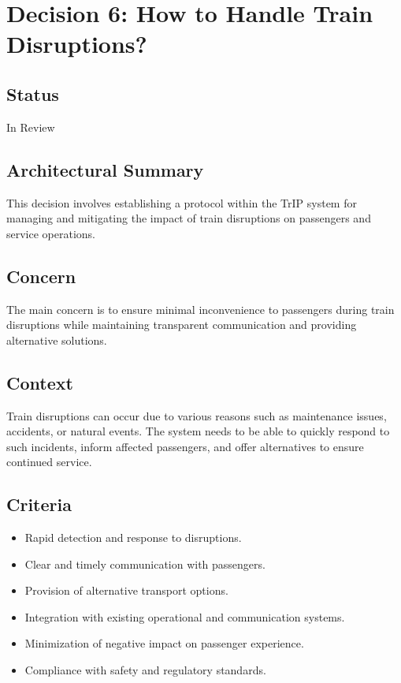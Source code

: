 \section*{Decision 6: How to Handle Train Disruptions?}

\subsection*{Status}
In Review

\subsection*{Architectural Summary}
This decision involves establishing a protocol within the TrIP system for managing and mitigating the impact of train disruptions on passengers and service operations.

\subsection*{Concern}
The main concern is to ensure minimal inconvenience to passengers during train disruptions while maintaining transparent communication and providing alternative solutions.

\subsection*{Context}
Train disruptions can occur due to various reasons such as maintenance issues, accidents, or natural events. The system needs to be able to quickly respond to such incidents, inform affected passengers, and offer alternatives to ensure continued service.

\subsection*{Criteria}
\begin{itemize}
    \item Rapid detection and response to disruptions.
    \item Clear and timely communication with passengers.
    \item Provision of alternative transport options.
    \item Integration with existing operational and communication systems.
    \item Minimization of negative impact on passenger experience.
    \item Compliance with safety and regulatory standards.
\end{itemize}

